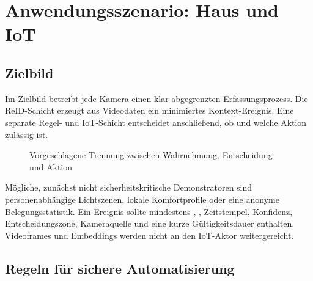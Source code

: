 \section{Anwendungsszenario: Haus und IoT}

\subsection{Zielbild}

Im Zielbild betreibt jede Kamera einen klar abgegrenzten Erfassungsprozess. Die
ReID-Schicht erzeugt aus Videodaten ein minimiertes Kontext-Ereignis. Eine
separate Regel- und IoT-Schicht entscheidet anschließend, ob und welche Aktion
zulässig ist.

\begin{figure}[H]
  \centering
  \caption{Vorgeschlagene Trennung zwischen Wahrnehmung, Entscheidung und Aktion}
  \label{fig:iot}
\end{figure}

Mögliche, zunächst nicht sicherheitskritische Demonstratoren sind
personenabhängige Lichtszenen, lokale Komfortprofile oder eine anonyme
Belegungsstatistik. Ein Ereignis sollte mindestens
, , Zeitstempel, Konfidenz,
Entscheidungszone, Kameraquelle und eine kurze Gültigkeitsdauer enthalten.
Videoframes und Embeddings werden nicht an den IoT-Aktor weitergereicht.

\subsection{Regeln für sichere Automatisierung}

